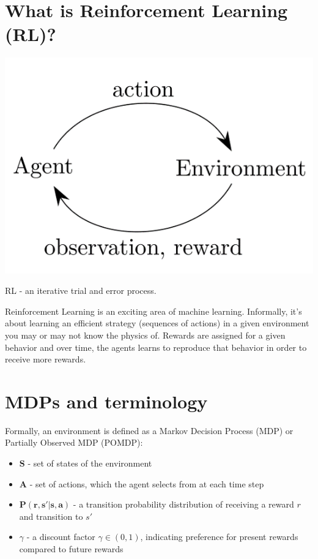 \documentclass{tufte-handout}
\begin{document}
\section{What is Reinforcement Learning (RL)?}
\begin{marginfigure}[2cm]
  \includegraphics[width=\linewidth]{RL}
  \caption{RL - an iterative trial and error process.}
\end{marginfigure}
Reinforcement Learning is an exciting area of machine learning. Informally, it's about learning an efficient strategy (sequences of actions) in a given environment you may or may not know the physics of. Rewards are assigned for a given behavior and  over time, the agents learns to reproduce that behavior in order to receive more rewards. 

\section{MDPs and terminology}
Formally, an environment is defined as a Markov Decision Process (MDP) or Partially Observed MDP (POMDP):
\begin{itemize}
  \item $\mathbf{S}$ - set of states of the environment
  \item $\mathbf{A}$ - set of actions, which the agent selects from at each time step
  \item $\mathbf{P(r,s'|s,a)}$ - a transition probability distribution of receiving a reward $r$ and transition to $s'$ 
  \item $\gamma$ - a discount factor $\gamma \in (0,1)$, indicating preference for present rewards compared to future rewards
\end{itemize}
\end{document}
